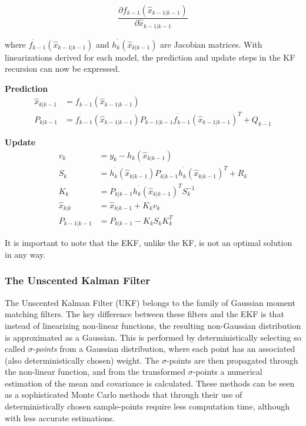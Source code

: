 \begin{equation}
\frac{\partial f_{k-1}(\hat{x}_{k-1|k-1})}{\partial \hat{x}_{k-1|k-1}}    
\end{equation}

where $f_{k-1}^{^\prime}(\hat{x}_{k-1|k-1})$ and $h_{k}^{^\prime}(\hat{x}_{k|k-1})$ are Jacobian matrices. With linearizations derived for each model, the prediction and update steps in the KF recursion can now be expressed. 

\textbf{Prediction}
\begin{equation}
	\begin{split}
		\hat{x}_{k|k-1} &= f_{k-1}(\hat{x}_{k-1|k-1}) \\
		P_{k|k-1} 		&= f_{k-1}^{^\prime}(\hat{x}_{k-1|k-1})P_{k-1|k-1}f_{k-1}^{^\prime}(\hat{x}_{k-1|k-1})^{T} + Q_{k-1}
	\end{split}
\end{equation}

\textbf{Update}
\begin{equation}
	\begin{split}
		v_k 			&= y_k - h_{k}(\hat{x}_{k|k-1}) \\
		S_k 			&= h_{k}^{^\prime}(\hat{x}_{k|k-1})P_{k|k-1}h_{k}^{^\prime}(\hat{x}_{k|k-1})^T + R_k \\
		K_k				&= P_{k|k-1}h_{k}^{^\prime}(\hat{x}_{k|k-1})^TS_k^{-1} \\
		\hat{x}_{k|k} 	&= \hat{x}_{k|k-1} + K_kv_k \\
		P_{k-1|k-1} 	&= P_{k|k-1} - K_kS_kK_k^T
	\end{split}
\end{equation}

It is important to note that the EKF, unlike the KF, is not an optimal solution in any way. 

\subsubsection{The Unscented Kalman Filter}
The Unscented Kalman Filter (UKF) belongs to the family of Gaussian moment matching filters. The key difference between these filters and the EKF is that instead of linearizing non-linear functions, the resulting non-Gaussian distribution is approximated as a Gaussian. This is performed by deterministically selecting so called $\sigma$-\emph{points} from a Gaussian distribution, where each point has an associated (also deterministically chosen) weight. The $\sigma$-points are then propagated through the non-linear function, and from the transformed $\sigma$-points a numerical estimation of the mean and covariance is calculated. These methods can be seen as a sophisticated Monte Carlo methods that through their use of deterministically chosen sample-points require less computation time, although with less accurate estimations. 

